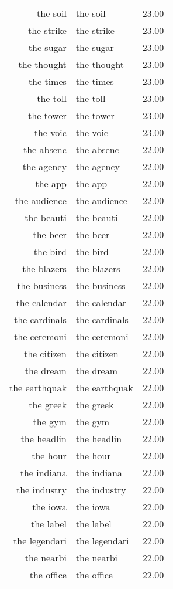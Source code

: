\begin{table}[ht]
\begin{tabular}{rlr}
  the soil & the soil & 23.00 \\ 
  the strike & the strike & 23.00 \\ 
  the sugar & the sugar & 23.00 \\ 
  the thought & the thought & 23.00 \\ 
  the times & the times & 23.00 \\ 
  the toll & the toll & 23.00 \\ 
  the tower & the tower & 23.00 \\ 
  the voic & the voic & 23.00 \\ 
  the absenc & the absenc & 22.00 \\ 
  the agency & the agency & 22.00 \\ 
  the app & the app & 22.00 \\ 
  the audience & the audience & 22.00 \\ 
  the beauti & the beauti & 22.00 \\ 
  the beer & the beer & 22.00 \\ 
  the bird & the bird & 22.00 \\ 
  the blazers & the blazers & 22.00 \\ 
  the business & the business & 22.00 \\ 
  the calendar & the calendar & 22.00 \\ 
  the cardinals & the cardinals & 22.00 \\ 
  the ceremoni & the ceremoni & 22.00 \\ 
  the citizen & the citizen & 22.00 \\ 
  the dream & the dream & 22.00 \\ 
  the earthquak & the earthquak & 22.00 \\ 
  the greek & the greek & 22.00 \\ 
  the gym & the gym & 22.00 \\ 
  the headlin & the headlin & 22.00 \\ 
  the hour & the hour & 22.00 \\ 
  the indiana & the indiana & 22.00 \\ 
  the industry & the industry & 22.00 \\ 
  the iowa & the iowa & 22.00 \\ 
  the label & the label & 22.00 \\ 
  the legendari & the legendari & 22.00 \\ 
  the nearbi & the nearbi & 22.00 \\ 
  the office & the office & 22.00 \\ 

\end{tabular}
\end{table}
